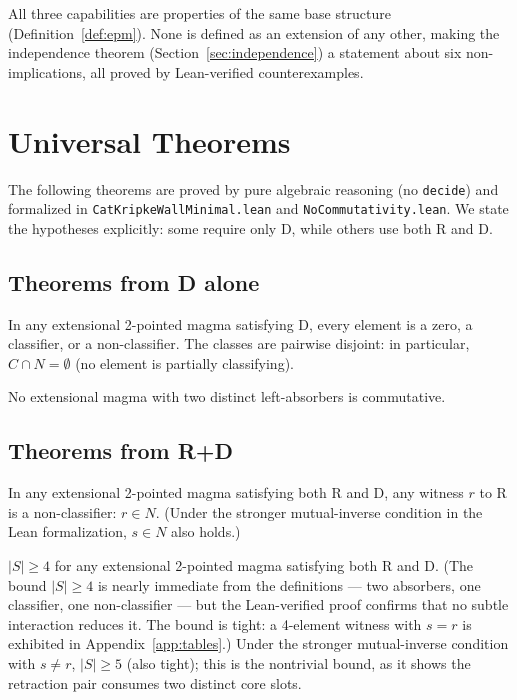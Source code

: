\documentclass[sigconf,screen]{acmart}
\theoremstyle{remark}
\begin{document}
All three capabilities are properties of the same base structure (Definition~\ref{def:epm}). None is defined as an extension of any other, making the independence theorem (Section~\ref{sec:independence}) a statement about six non-implications, all proved by Lean-verified counterexamples.

\section{Universal Theorems}
\label{sec:universal}

The following theorems are proved by pure algebraic reasoning (no \texttt{decide}) and formalized in \texttt{CatKripkeWallMinimal.lean} and \texttt{NoCommutativity.lean}. We state the hypotheses explicitly: some require only D, while others use both R and D.

\subsection{Theorems from D alone}

\begin{theorem}
\label{thm:three-cat}
In any extensional 2-pointed magma satisfying D, every element is a zero, a classifier, or a non-classifier. The classes are pairwise disjoint: in particular, $C \cap N = \emptyset$ (no element is partially classifying).
\end{theorem}

\begin{theorem}[Asymmetry]
\label{thm:asymmetry}
No extensional magma with two distinct left-absorbers is commutative.
\end{theorem}

\subsection{Theorems from R+D}

\begin{theorem}
\label{thm:placement}
In any extensional 2-pointed magma satisfying both R and D, any witness $r$ to R is a non-classifier: $r \in N$. (Under the stronger mutual-inverse condition in the Lean formalization, $s \in N$ also holds.)
\end{theorem}

\begin{theorem}
\label{thm:card}
$|S| \geq 4$ for any extensional 2-pointed magma satisfying both R and D. (The bound $|S| \geq 4$ is nearly immediate from the definitions --- two absorbers, one classifier, one non-classifier --- but the Lean-verified proof confirms that no subtle interaction reduces it. The bound is tight: a 4-element witness with $s = r$ is exhibited in Appendix~\ref{app:tables}.) Under the stronger mutual-inverse condition with $s \neq r$, $|S| \geq 5$ (also tight); this is the nontrivial bound, as it shows the retraction pair consumes two distinct core slots.
\end{theorem}
\end{document}
